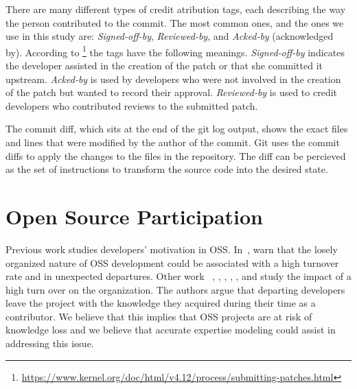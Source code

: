There are many different types of credit atribution tags, each describing the way the person contributed to the commit. The most common ones, and the ones we use in this study are: \textit{Signed-off-by}, \textit{Reviewed-by}, and \textit{Acked-by} (acknowledged by). According to \footnote{\url{https://www.kernel.org/doc/html/v4.12/process/submitting-patches.html}} the tags have the following meanings. \textit{Signed-off-by} indicates the developer assisted in the creation of the patch or that she committed it upstream. \textit{Acked-by} is used by developers who were not involved in the creation of the patch but wanted to record their approval. \textit{Reviewed-by} is used to credit developers who contributed reviews to the submitted patch. 

The commit diff, which sits at the end of the git log output, shows the exact files and lines that were modified by the author of the commit. Git uses the commit diffs to apply the changes to the files in the repository. The diff can be percieved as the set of instructions to transform the source code into the desired state.



\section{Open Source Participation}

Previous work studies developers' motivation in \ac{OSS}. In~\citep{Wu-oss}, warn that the losely organized nature of OSS development could be associated with a high turnover rate and in unexpected departures. Other work ~\citep{Rigby}, \citep{Foucault}, \citep{Izquierdo-Cortazar}, \citep{Mockus:2010}, \citep{Torchiano:2011:MPT:1985374.1985379}, and \citep{Ricca:2011:DCT:2022348.2022383} study the impact of a high turn over on the organization. The authors argue that departing developers leave the project with the knowledge they acquired during their time as a contributor. We believe that this implies that OSS projects are at risk of knowledge loss and we believe that accurate expertise modeling could assist in addressing this issue.





